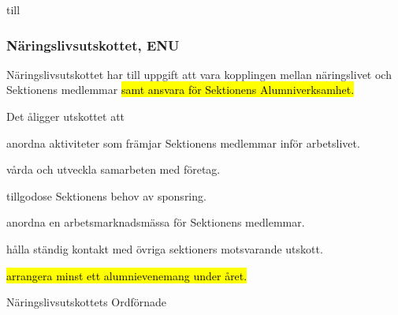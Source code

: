 \documentclass[../_main/handlingar.tex]{subfiles}
\begin{document}
\begin{attsatser}
    till

    \subsubsection{Näringslivsutskottet, ENU}
    Näringslivsutskottet har till uppgift att vara kopplingen mellan näringslivet och Sektionens medlemmar \hl{samt ansvara för Sektionens Alumniverksamhet.} 

    Det åligger utskottet att
    \begin{tightdashlist}
    \item anordna aktiviteter som främjar Sektionens medlemmar inför arbetslivet.
    \item vårda och utveckla samarbeten med företag.
    \item tillgodose Sektionens behov av sponsring.
    \item anordna en arbetsmarknadsmässa för Sektionens medlemmar.
    \item hålla ständig kontakt med övriga sektioners motsvarande utskott.
    \item \hl{arrangera minst ett alumnievenemang under året.}
    \end{tightdashlist} 

    \changenote



\end{attsatser}

\begin{signatures}{1}
    \ist
    \signature{\enuordf}{Näringslivsutskottets Ordförnade}
\end{signatures}
\end{document}
